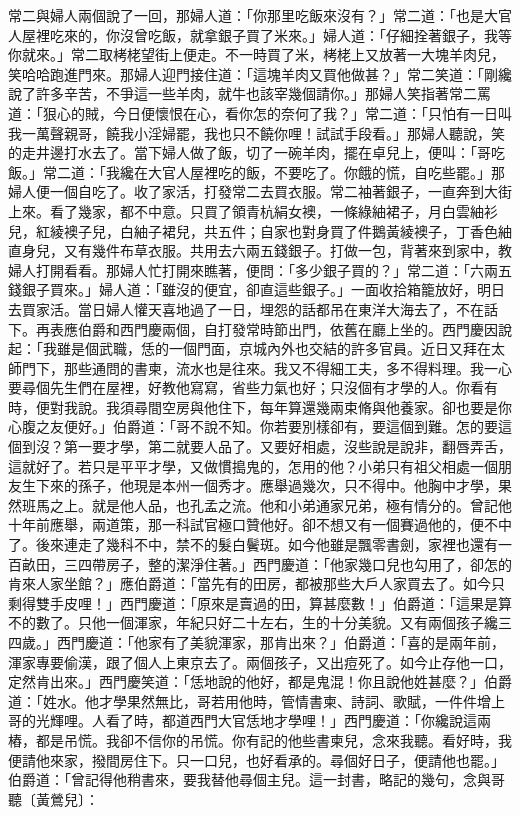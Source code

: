 常二與婦人兩個說了一回，那婦人道：「你那里吃飯來沒有？」常二道：「也是大官人屋裡吃來的，你沒曾吃飯，就拿銀子買了米來。」婦人道：「仔細拴著銀子，我等你就來。」常二取栲栳望街上便走。不一時買了米，栲栳上又放著一大塊羊肉兒，笑哈哈跑進門來。那婦人迎門接住道：「這塊羊肉又買他做甚？」常二笑道：「剛纔說了許多辛苦，不爭這一些羊肉，就牛也該宰幾個請你。」那婦人笑指著常二罵道：「狠心的賊，今日便懷恨在心，看你怎的奈何了我？」常二道：「只怕有一日叫我一萬聲親哥，饒我小淫婦罷，我也只不饒你哩！試試手段看。」那婦人聽說，笑的走井邊打水去了。當下婦人做了飯，切了一碗羊肉，擺在卓兒上，便叫：「哥吃飯。」常二道：「我纔在大官人屋裡吃的飯，不要吃了。你餓的慌，自吃些罷。」那婦人便一個自吃了。收了家活，打發常二去買衣服。常二袖著銀子，一直奔到大街上來。看了幾家，都不中意。只買了領青杭絹女襖，一條綠紬裙子，月白雲紬衫兒，紅綾襖子兒，白紬子裙兒，共五件；自家也對身買了件鵝黃綾襖子，丁香色紬直身兒，又有幾件布草衣服。共用去六兩五錢銀子。打做一包，背著來到家中，教婦人打開看看。那婦人忙打開來瞧著，便問：「多少銀子買的？」常二道：「六兩五錢銀子買來。」婦人道：「雖沒的便宜，卻直這些銀子。」一面收拾箱籠放好，明日去買家活。當日婦人懽天喜地過了一日，埋怨的話都吊在東洋大海去了，不在話下。再表應伯爵和西門慶兩個，自打發常時節出門，依舊在廳上坐的。西門慶因說起：「我雖是個武職，恁的一個門面，京城內外也交結的許多官員。近日又拜在太師門下，那些通問的書柬，流水也是往來。我又不得細工夫，多不得料理。我一心要尋個先生們在屋裡，好教他寫寫，省些力氣也好；只沒個有才學的人。你看有時，便對我說。我須尋間空房與他住下，每年算還幾兩束脩與他養家。卻也要是你心腹之友便好。」伯爵道：「哥不說不知。你若要別樣卻有，要這個到難。怎的要這個到沒？第一要才學，第二就要人品了。又要好相處，沒些說是說非，翻唇弄舌，這就好了。若只是平平才學，又做慣搗鬼的，怎用的他？小弟只有祖父相處一個朋友生下來的孫子，他現是本州一個秀才。應舉過幾次，只不得中。他胸中才學，果然班馬之上。就是他人品，也孔孟之流。他和小弟通家兄弟，極有情分的。曾記他十年前應舉，兩道策，那一科試官極口贊他好。卻不想又有一個賽過他的，便不中了。後來連走了幾科不中，禁不的髮白鬢斑。如今他雖是飄零書劍，家裡也還有一百畝田，三四帶房子，整的潔淨住著。」西門慶道：「他家幾口兒也勾用了，卻怎的肯來人家坐館？」應伯爵道：「當先有的田房，都被那些大戶人家買去了。如今只剩得雙手皮哩！」西門慶道：「原來是賣過的田，算甚麼數！」伯爵道：「這果是算不的數了。只他一個渾家，年紀只好二十左右，生的十分美貌。又有兩個孩子纔三四歲。」西門慶道：「他家有了美貌渾家，那肯出來？」伯爵道：「喜的是兩年前，渾家專要偷漢，跟了個人上東京去了。兩個孩子，又出痘死了。如今止存他一口，定然肯出來。」西門慶笑道：「恁地說的他好，都是鬼混！你且說他姓甚麼？」伯爵道：「姓水。他才學果然無比，哥若用他時，管情書柬、詩詞、歌賦，一件件增上哥的光輝哩。人看了時，都道西門大官恁地才學哩！」西門慶道：「你纔說這兩樁，都是吊慌。我卻不信你的吊慌。你有記的他些書柬兒，念來我聽。看好時，我便請他來家，撥間房住下。只一口兒，也好看承的。尋個好日子，便請他也罷。」伯爵道：「曾記得他稍書來，要我替他尋個主兒。這一封書，略記的幾句，念與哥聽〔黃鶯兒〕：

